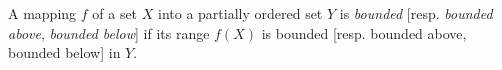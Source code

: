 A mapping $f$ of a set $X$ into a partially ordered set $Y$ is \textit{bounded} [resp. \textit{bounded above}, \textit{bounded below}] if its range $f(X)$ is bounded [resp. bounded above, bounded below] in $Y$.

